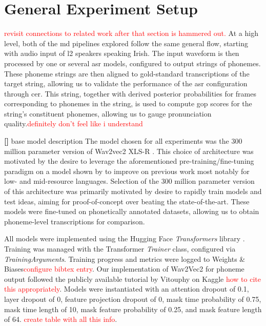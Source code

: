 \documentclass[thesis]{cluu}
\newcounter{paranum}
\newcommand{\numberedparagraph}{\par\refstepcounter{paranum}\textbf{[\theparanum] }}
\newcommand{\todo}[1]{\textcolor{red}{#1}}
\begin{document}
\section{General Experiment Setup}
\todo{revisit connections to related work after that section is hammered out.}
At a high level, both of the \gls{md} pipelines explored follow the same general flow, starting with audio input of \gls{l2} speakers speaking Irish. The input waveform is then processed by one or several \gls{asr} models, configured to output strings of phonemes. These phoneme strings are then aligned to gold-standard transcriptions of the target string, allowing us to validate the performance of the \gls{asr} configuration through \gls{cer}. This string, together with derived posterior probabilities for frames corresponding to phonemes in the string, is used to compute \gls{gop} scores for the string's constituent phonemes, allowing us to gauge pronunciation quality.\todo{definitely don't feel like i understand }

\numberedparagraph{base model description}
The model chosen for all experiments was the 300 million parameter version of Wav2vec2 XLS-R \parencite{babuXLSRSelfsupervisedCrosslingual2021}. This choice of architecture was motivated by the desire to leverage the aforementioned pre-training/fine-tuning paradigm on a model shown by \textcite{babuXLSRSelfsupervisedCrosslingual2021} to improve on previous work most notably for low- and mid-resource languages. Selection of the 300 million parameter version of this architecture was primarily motivated by desire to rapidly train models and test ideas, aiming for proof-of-concept over beating the state-of-the-art. These models were fine-tuned on phonetically annotated datasets, allowing us to obtain phoneme-level transcriptions for comparison.

All models were implemented using the Hugging Face \textit{Transformers} library \parencite{wolfTransformersStateoftheArtNatural2020}. Training was managed with the Transformer \textit{Trainer} class, configured via \textit{TrainingArguments}. Training progress and metrics were logged to Weights \& Biases\todo{configure bibtex entry}. Our implementation of Wav2Vec2 for phoneme output followed the publicly available tutorial by Vitouphy on Kaggle \todo{how to cite this appropriately}. Models were instantiated with an attention dropout of 0.1, layer dropout of 0, feature projection dropout of 0, mask time probability of 0.75, mask time length of 10, mask feature probability of 0.25, and mask feature length of 64. \todo{create table with all this info}.
\end{document}
